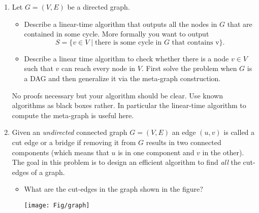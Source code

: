 \documentclass[11pt]{article}
\begin{document}
\begin{enumerate}
\item Let $G=(V,E)$ be a directed graph.
  \begin{itemize}
  \item Describe a linear-time algorithm that outputs all the nodes in
    $G$ that are contained in some cycle. More formally you want to
    output
    $$S = \{ v \in V \mid \text{there is some cycle in $G$ that
      contains v}\}.$$
  \item Describe a linear time algorithm to check whether there is a
    node $v \in V$ such that $v$ can reach every node in $V$. First
    solve the problem when $G$ is a DAG and then generalize it via the
    meta-graph construction.
  \end{itemize}
  No proofs necessary but your algorithm should be clear. Use known
  algorithms as black boxes rather. In particular the linear-time algorithm to
  compute the meta-graph is useful here.

\item Given an \emph{undirected} connected graph $G=(V,E)$ an edge $(u,v)$ is
  called a cut edge or a bridge if removing it from $G$ results in
  two connected components (which means that $u$ is in one component
  and $v$ in the other). The goal in this problem is to design an efficient
  algorithm to find {\em all} the cut-edges of a graph.

  \begin{itemize}
  \item What are the cut-edges in the graph shown in the figure?
           \begin{center}
                \texttt{[image: Fig/graph]}
       \end{center}


\end{itemize}
\end{enumerate}
\end{document}
